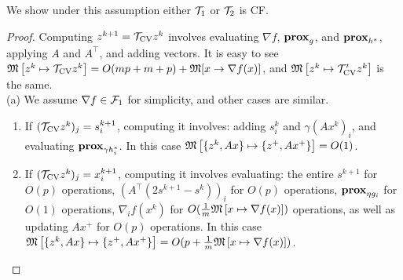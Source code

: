 {{{We show under this assumption either ${\mathcal{T}}_1$ or ${\mathcal{T}}_2$ is CF. }
\begin{proof}
Computing $z^{k+1}={{\mathcal{T}}_{\textnormal{CV}}} z^k$ involves evaluating $\nabla f$, $\mathbf{prox}_g$, and $\mathbf{prox}_{h^*}$, applying $A$ and $A^\top$, and adding vectors.
It is easy to see  $\mathfrak{M}\left[{z^k}\mapsto {{{\mathcal{T}}_{\textnormal{CV}}}z^k}\right]=O(mp+m+p)+\mathfrak{M}[x\to\nabla f(x)]$, and $\mathfrak{M}\left[{z^k}\mapsto {{\mathcal{T}}'_{\textnormal{CV}}z^k}\right]$ is the same.\\
(a) We assume $\nabla f\in{\mathcal{F}}_1$ for simplicity, and other cases are similar.
\begin{enumerate}
\item If $({{\mathcal{T}}_{\textnormal{CV}}} z^k)_j=s^{k+1}_i$, computing it involves: adding $s^k_i$ and $\gamma (Ax^k)_i$, and evaluating $\mathbf{prox}_{\gamma h^*_i}$. In this case $\mathfrak{M}\left[{\{z^k,Ax\}}\mapsto {\{z^+,Ax^+\}}\right]=O(1)$.
\item If $({{\mathcal{T}}_{\textnormal{CV}}} z^k)_j=x^{k+1}_i$, computing it involves evaluating: the entire $s^{k+1}$ for $O(p)$ operations, $(A^\top(2s^{k+1}-s^k))_i$ for $O(p)$ operations, $\mathbf{prox}_{\eta g_i}$ for $O(1)$ operations, $\nabla_i f({x}^{k})$ for $O(\frac{1}{m}\mathfrak{M}\left[{x}\mapsto {\nabla f(x)}\right])$ operations, as well as updating $Ax^+$ for $O(p)$ operations.
In this case\\ $\mathfrak{M}\left[{\{z^k,Ax\}}\mapsto {\{z^+,Ax^+\}}\right]=O(p+\frac{1}{m}\mathfrak{M}\left[{x}\mapsto {\nabla f(x)}\right])$.

\end{enumerate}
\end{proof}}}
